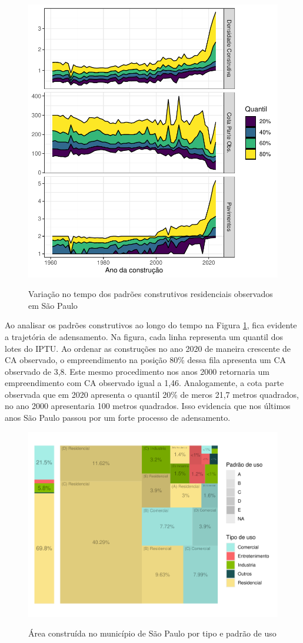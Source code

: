 \begin{apendicesenv}
\clearpage

\begin{figure}[h]
    \centering
    \caption{Variação no tempo dos padrões construtivos residenciais observados em São Paulo}
    \includegraphics[width = .75\linewidth]{figuras/indicadores_tempo.pdf}
    \label{fig:indicadores-tempo}
\end{figure}

Ao analisar os padrões construtivos ao longo do tempo na Figura \ref{fig:indicadores-tempo}, fica evidente a trajetória de adensamento. Na figura, cada linha representa um quantil dos lotes do IPTU. Ao ordenar as construções no ano 2020 de maneira crescente de CA observado, o empreendimento na posição 80\% dessa fila apresenta um CA observado de 3,8. Este mesmo procedimento nos anos 2000 retornaria um empreendimento com CA observado igual a 1,46. Analogamente, a cota parte observada que em 2020 apresenta o quantil 20\% de meros 21,7 metros quadrados, no ano 2000 apresentaria 100 metros quadrados. Isso evidencia que nos últimos anos São Paulo passou por um forte processo de adensamento.


\clearpage

\begin{figure}
    \centering
    \caption{Área construída no município de São Paulo por tipo e padrão de uso}
    \includegraphics[width = .8\linewidth]{figuras/tree_area_construida.pdf}
    \label{fig:area_construida}
\end{figure}


\end{apendicesenv}
